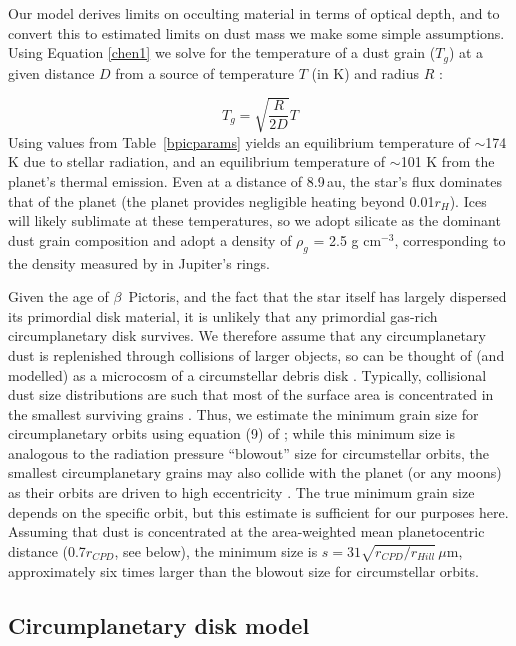 \documentclass[longauth]{aa} %
\begin{document}
Our model derives limits on occulting material in terms of optical depth, and to convert this to estimated limits on dust mass we make some simple assumptions.
%
Using Equation \ref{chen1} we solve for the temperature of a dust grain ($T_{g}$) at a given distance $D$ from a source of temperature $T$ (in K) and radius $R$ \citep{Chen01}:

\begin{equation}
\label{chen1}
T_{g} = \sqrt{\frac{R}{2D}}T
\end{equation}
Using values from Table~\ref{bpicparams} yields an equilibrium temperature of $\sim$174 K due to stellar radiation, and an equilibrium temperature of $\sim$101 K from the planet's thermal emission.
%
Even at a distance of 8.9\,au, the star's flux dominates that of the planet (the planet provides negligible heating beyond 0.01$r_H$). Ices will likely sublimate at these temperatures, so we adopt silicate as the dominant dust grain composition and adopt a density of $\rho_g$ = 2.5 g cm$^{-3}$, corresponding to the density measured by \citet{Chen01} in Jupiter's rings.

Given the age of $\beta$~Pictoris, and the fact that the star itself has largely dispersed its primordial disk material, it is unlikely that any primordial gas-rich circumplanetary disk survives.
%
We therefore assume that any circumplanetary dust is replenished through collisions of larger objects, so can be thought of (and modelled) as a microcosm of a circumstellar debris disk \citep[e.g.][]{Kennedy11}.
%
Typically, collisional dust size distributions are such that most of the surface area is concentrated in the smallest surviving grains \citep{1969JGR....74.2531D}.
%
Thus, we estimate the minimum grain size for circumplanetary orbits using equation (9) of \citet{Kennedy11}; while this minimum size is analogous to the radiation pressure ``blowout'' size for circumstellar orbits, the smallest circumplanetary grains may also collide with the planet (or any moons) as their orbits are driven to high eccentricity \citep[see][]{Burns79}.
%
The true minimum grain size depends on the specific orbit, but this estimate is sufficient for our purposes here.
%
Assuming that dust is concentrated at the area-weighted mean planetocentric distance (0.7$r_{CPD}$, see below), the minimum size is $s = 31 \sqrt{r_{CPD}/r_{Hill}}$\,$\mu$m, approximately six times larger than the blowout size for circumstellar orbits.


\subsection{Circumplanetary disk model}\label{mellonestimate}
\end{document}
